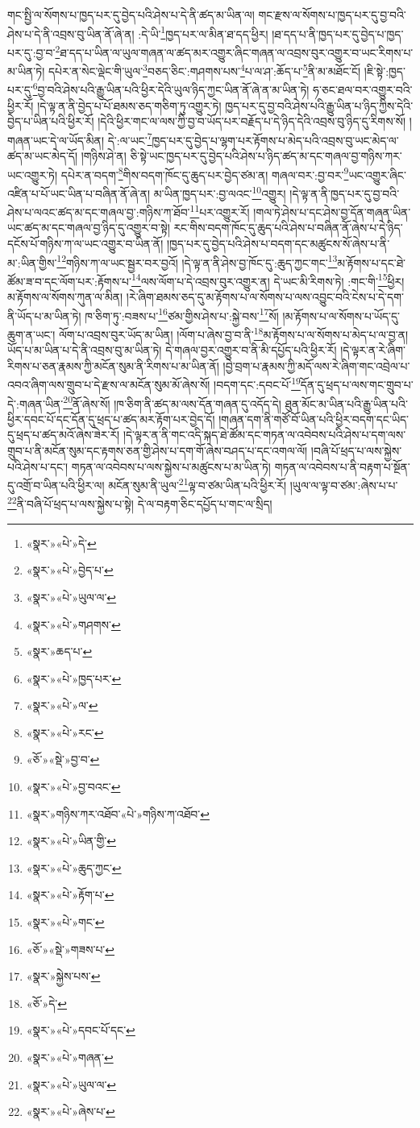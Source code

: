 གང་སྤྱི་ལ་སོགས་པ་ཁྱད་པར་དུ་བྱེད་པའི་ཤེས་པ་དེ་ནི་ཚད་མ་ཡིན་ལ། གང་རྫས་ལ་སོགས་པ་ཁྱད་པར་དུ་བྱ་བའི་ཤེས་པ་དེ་ནི་འབྲས་བུ་ཡིན་ནོ་ཞེ་ན། :དེ་ཡི་\footnote{«སྣར་»«པེ་»དེ་}ཁྱད་པར་ལ་མིན་ཐ་དད་ཕྱིར། །ཐ་དད་པ་ནི་ཁྱད་པར་དུ་བྱེད་པ་ཁྱད་པར་དུ་:བྱ་བ་\footnote{«སྣར་»«པེ་»བྱེད་པ་}ཐ་དད་པ་ཡིན་ལ་ཡུལ་གཞན་ལ་ཚད་མར་འགྱུར་ཞིང་གཞན་ལ་འབྲས་བུར་འགྱུར་བ་ཡང་རིགས་པ་མ་ཡིན་ཏེ། དཔེར་ན་སེང་ལྡེང་གི་ཡུལ་\footnote{«སྣར་»«པེ་»ཡུལ་ལ་}བཅད་ཅིང་:གཤགས་པས་\footnote{«སྣར་»«པེ་»གཤགས་}པ་ལ་ཤ་:ཆོད་པ་\footnote{«སྣར་»ཆད་པ་}ནི་མ་མཐོང་ངོ། །ཇི་སྟེ་:ཁྱད་པར་དུ་\footnote{«སྣར་»«པེ་»ཁྱད་པར་}བྱ་བའི་ཤེས་པའི་རྒྱུ་ཡིན་པའི་ཕྱིར་དེའི་ཡུལ་ཉིད་ཀྱང་ཡིན་ནོ་ཞེ་ན་མ་ཡིན་ཏེ། ཧ་ཅང་ཐལ་བར་འགྱུར་བའི་ཕྱིར་རོ། །དེ་ལྟ་ན་ནི་བྱེད་པ་པོ་ཐམས་ཅད་གཅིག་ཏུ་འགྱུར་ཏེ། ཁྱད་པར་དུ་བྱ་བའི་ཤེས་པའི་རྒྱུ་ཡིན་པ་ཉིད་ཀྱིས་དེའི་བྱེད་པ་ཡིན་པའི་ཕྱིར་རོ། །དེའི་ཕྱིར་གང་ལ་ལས་ཀྱི་བྱ་བ་ཡོད་པར་བརྗོད་པ་དེ་ཉིད་དེའི་འབྲས་བུ་ཉིད་དུ་རིགས་སོ། །གཞན་ཡང་དེ་ལ་ཡོད་མིན། དེ་:ལ་ཡང་\footnote{«སྣར་»«པེ་»ལ་}ཁྱད་པར་དུ་བྱེད་པ་ལྷག་པར་རྟོགས་པ་མེད་པའི་འབྲས་བུ་ཡང་མེད་ལ་ཚད་མ་ཡང་མེད་དོ། །གཉིས་ཤེ་ན། ཅི་སྟེ་ཡང་ཁྱད་པར་དུ་བྱེད་པའི་ཤེས་པ་ཉིད་ཚད་མ་དང་གཞལ་བྱ་གཉིས་ཀར་ཡང་འགྱུར་ཏེ། དཔེར་ན་བདག་\footnote{«སྣར་»«པེ་»རང་}གིས་བདག་ཁོང་དུ་ཆུད་པར་བྱེད་ཙམ་ན། གཞལ་བར་:བྱ་བར་\footnote{«ཅོ་»«སྡེ་»བྱ་བ་}ཡང་འགྱུར་ཞིང་འཛིན་པ་པོ་ཡང་ཡིན་པ་བཞིན་ནོ་ཞེ་ན། མ་ཡིན་ཁྱད་པར་:བྱ་ལའང་\footnote{«སྣར་»«པེ་»བྱ་བའང་}འགྱུར། །དེ་ལྟ་ན་ནི་ཁྱད་པར་དུ་བྱ་བའི་ཤེས་པ་ལའང་ཚད་མ་དང་གཞལ་བྱ་:གཉིས་ཀ་ཐོབ་\footnote{«སྣར་»གཉིས་ཀར་འཐོབ་«པེ་»གཉིས་ཀ་འཐོབ་}པར་འགྱུར་རོ། །གལ་ཏེ་ཤེས་པ་དང་ཤེས་བྱ་དོན་གཞན་ཡིན་ཡང་ཚད་མ་དང་གཞལ་བྱ་ཉིད་དུ་འགྱུར་བ་སྟེ། རང་གིས་བདག་ཁོང་དུ་ཆུད་པའི་ཤེས་པ་བཞིན་ནོ་ཞེས་པ་དེ་ཉིད་དངོས་པོ་གཉིས་ཀ་ལ་ཡང་འགྱུར་བ་ཡིན་ནོ། །ཁྱད་པར་དུ་བྱེད་པའི་ཤེས་པ་བདག་དང་མཚུངས་སོ་ཞེས་པ་ནི་མ་:ཡིན་གྱིས་\footnote{«སྣར་»«པེ་»ཡིན་གྱི་}གཉིས་ཀ་ལ་ཡང་སྦྱར་བར་བྱའོ། །དེ་ལྟ་ན་ནི་ཤེས་བྱ་ཁོང་དུ་:ཆུད་ཀྱང་གང་\footnote{«སྣར་»«པེ་»ཆུད་ཀྱང་}མ་རྟོགས་པ་དང་ཐེ་ཚོམ་ཟ་བ་དང་ལོག་པར་:རྟོགས་པ་\footnote{«སྣར་»«པེ་»རྟོག་པ་}ལས་ལོག་པ་དེ་འབྲས་བུར་འགྱུར་ན། དེ་ཡང་མི་རིགས་ཏེ། :གང་གི་\footnote{«སྣར་»«པེ་»གང་}ཕྱིར། མ་རྟོགས་ལ་སོགས་ཀུན་ལ་མིན། །རེ་ཞིག་ཐམས་ཅད་དུ་མ་རྟོགས་པ་ལ་སོགས་པ་ལས་འབྱུང་བའི་ངེས་པ་དེ་དག་ནི་ཡོད་པ་མ་ཡིན་ཏེ། ཁ་ཅིག་ཏུ་:བཟས་པ་\footnote{«ཅོ་»«སྡེ་»གཟས་པ་}ཙམ་གྱིས་ཤེས་པ་:སྐྱེ་བས་\footnote{«སྣར་»སྐྱེས་པས་}སོ། །མ་རྟོགས་པ་ལ་སོགས་པ་ཡོད་དུ་ཆུག་ན་ཡང་། ལོག་པ་འབྲས་བུར་ཡོད་མ་ཡིན། །ལོག་པ་ཞེས་བྱ་བ་ནི་\footnote{«ཅོ་»དེ་}མ་རྟོགས་པ་ལ་སོགས་པ་མེད་པ་ལ་བྱ་ན། ཡོད་པ་མ་ཡིན་པ་དེ་ནི་འབྲས་བུ་མ་ཡིན་ཏེ། དེ་གཞལ་བྱར་འགྱུར་བ་ནི་མི་དཔྱོད་པའི་ཕྱིར་རོ། །དེ་ལྟར་ན་རེ་ཞིག་རིགས་པ་ཅན་རྣམས་ཀྱི་མངོན་སུམ་ནི་རིགས་པ་མ་ཡིན་ནོ། །བྱེ་བྲག་པ་རྣམས་ཀྱི་མདོ་ལས་རེ་ཞིག་གང་འབྲེལ་པ་འབའ་ཞིག་ལས་གྲུབ་པ་དེ་རྫས་ལ་མངོན་སུམ་མོ་ཞེས་སོ། །བདག་དང་:དབང་པོ་\footnote{«སྣར་»«པེ་»དབང་པོ་དང་}དོན་དུ་ཕྲད་པ་ལས་གང་གྲུབ་པ་དེ་:གཞན་ཡིན་\footnote{«སྣར་»«པེ་»གཞན་}ནོ་ཞེས་སོ། །ཁ་ཅིག་ནི་ཚད་མ་ལས་དོན་གཞན་དུ་འདོད་དེ། ཐུན་མོང་མ་ཡིན་པའི་རྒྱུ་ཡིན་པའི་ཕྱིར་དབང་པོ་དང་དོན་དུ་ཕྲད་པ་ཚད་མར་རྟོག་པར་བྱེད་དོ། །གཞན་དག་ནི་གཙོ་བོ་ཡིན་པའི་ཕྱིར་བདག་དང་ཡིད་དུ་ཕྲད་པ་ཚད་མའོ་ཞེས་ཟེར་རོ། །དེ་ལྟར་ན་ནི་གང་འདི་སྐད་ཐེ་ཚོམ་དང་གཏན་ལ་འབེབས་པའི་ཤེས་པ་དག་ལས་གྲུབ་པ་ནི་མངོན་སུམ་དང་རྟགས་ཅན་གྱི་ཤེས་པ་དག་གོ་ཞེས་བཤད་པ་དང་འགལ་ལོ། །བཞི་པོ་ཕྲད་པ་ལས་སྐྱེས་པའི་ཤེས་པ་དང་། གཏན་ལ་འབེབས་པ་ལས་སྐྱེས་པ་མཚུངས་པ་མ་ཡིན་ཏེ། གཏན་ལ་འབེབས་པ་ནི་བརྟག་པ་སྔོན་དུ་འགྲོ་བ་ཡིན་པའི་ཕྱིར་ལ། མངོན་སུམ་ནི་ཡུལ་\footnote{«སྣར་»«པེ་»ཡུལ་ལ་}ལྟ་བ་ཙམ་ཡིན་པའི་ཕྱིར་རོ། །ཡུལ་ལ་ལྟ་བ་ཙམ་:ཞེས་པ་པ་\footnote{«སྣར་»«པེ་»ཞེས་པ་}ནི་བཞི་པོ་ཕྲད་པ་ལས་སྐྱེས་པ་སྟེ། དེ་ལ་བརྟག་ཅིང་དཔྱོད་པ་གང་ལ་སྲིད། 